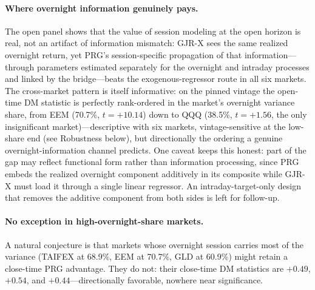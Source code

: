 \documentclass[11pt,a4paper]{article}
\begin{document}
\paragraph{Where overnight information genuinely pays.} The open panel shows that the value of session modeling at the open horizon is real, not an artifact of information mismatch: GJR-X sees the same realized overnight return, yet PRG's session-specific propagation of that information---through parameters estimated separately for the overnight and intraday processes and linked by the bridge---beats the exogenous-regressor route in all six markets. The cross-market pattern is itself informative: on the pinned vintage the open-time DM statistic is perfectly rank-ordered in the market's overnight variance share, from EEM (70.7\%, $t=+10.14$) down to QQQ (38.5\%, $t=+1.56$, the only insignificant market)---descriptive with six markets, vintage-sensitive at the low-share end (see Robustness below), but directionally the ordering a genuine overnight-information channel predicts. One caveat keeps this honest: part of the gap may reflect functional form rather than information processing, since PRG embeds the realized overnight component additively in its composite while GJR-X must load it through a single linear regressor. An intraday-target-only design that removes the additive component from both sides is left for follow-up.

\paragraph{No exception in high-overnight-share markets.} A natural conjecture is that markets whose overnight session carries most of the variance (TAIFEX at 68.9\%, EEM at 70.7\%, GLD at 60.9\%) might retain a close-time PRG advantage. They do not: their close-time DM statistics are $+0.49$, $+0.54$, and $+0.44$---directionally favorable, nowhere near significance.
\end{document}
